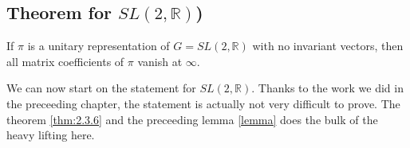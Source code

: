\documentclass[
  12pt
]{article}
\theoremstyle{break}
\theoremstyle{plain}
\newcommand{\sltr}{\ensuremath{SL(2, \mathbb{R})}}
\begin{document}

  \hypertarget{theorem-for-sl2-r}{%
    \subsection{Theorem for \texorpdfstring{$SL(2, \mathbb{R})$}{SN(2, R)})}\label{theorem-for-sl2-r}}

  If $\pi$ is a unitary representation of $G = SL(2, \mathbb{R})$ with no
  invariant vectors, then all matrix coefficients of $\pi$ vanish at $\infty$.


  We can now start on the statement for \sltr. Thanks to the work we did in the
  preceeding chapter, the statement is actually not very difficult to prove. The
  theorem \ref{thm:2.3.6} and the preceeding lemma \ref{lemma} does the bulk of
  the heavy lifting here.
\end{document}
